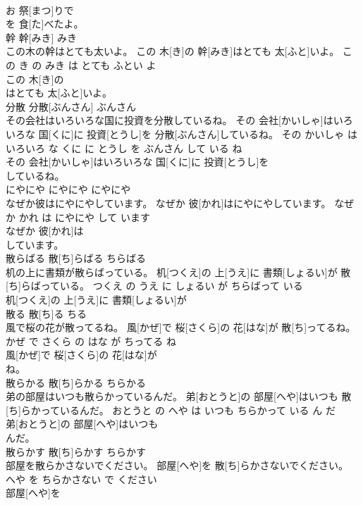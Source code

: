 \documentclass[8pt]{extreport}
\begin{document}
\begin{CJK}{UTF8}{min}
\\	お 祭[まつ]りで
\\	を 食[た]べたよ。			
\\	幹	幹[みき]	みき	
\\	この木の幹はとても太いよ。	この 木[き]の 幹[みき]はとても 太[ふと]いよ。	この き の みき は とても ふとい よ	
\\	この 木[き]の
\\	はとても 太[ふと]いよ。			
\\	分散	分散[ぶんさん]	ぶんさん	
\\	その会社はいろいろな国に投資を分散しているね。	その 会社[かいしゃ]はいろいろな 国[くに]に 投資[とうし]を 分散[ぶんさん]しているね。	その かいしゃ は いろいろ な くに に とうし を ぶんさん して いる ね	
\\	その 会社[かいしゃ]はいろいろな 国[くに]に 投資[とうし]を
\\	しているね。			
\\	にやにや	にやにや	にやにや	
\\	なぜか彼はにやにやしています。	なぜか 彼[かれ]はにやにやしています。	なぜ か かれ は にやにや して います	
\\	なぜか 彼[かれ]は
\\	しています。			
\\	散らばる	散[ち]らばる	ちらばる	
\\	机の上に書類が散らばっている。	机[つくえ]の 上[うえ]に 書類[しょるい]が 散[ち]らばっている。	つくえ の うえ に しょるい が ちらばって いる	
\\	机[つくえ]の 上[うえ]に 書類[しょるい]が
\\	散る	散[ち]る	ちる	
\\	風で桜の花が散ってるね。	風[かぜ]で 桜[さくら]の 花[はな]が 散[ち]ってるね。	かぜ で さくら の はな が ちってる ね	
\\	風[かぜ]で 桜[さくら]の 花[はな]が
\\	ね。			
\\	散らかる	散[ち]らかる	ちらかる	
\\	弟の部屋はいつも散らかっているんだ。	弟[おとうと]の 部屋[へや]はいつも 散[ち]らかっているんだ。	おとうと の へや は いつも ちらかって いる ん だ	
\\	弟[おとうと]の 部屋[へや]はいつも
\\	んだ。			
\\	散らかす	散[ち]らかす	ちらかす	
\\	部屋を散らかさないでください。	部屋[へや]を 散[ち]らかさないでください。	へや を ちらかさない で ください	
\\	部屋[へや]を

\end{CJK}
\end{document}

